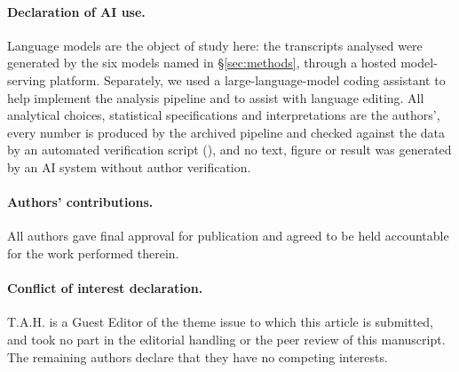 \documentclass[11pt,a4paper]{article}
\begin{document}
\paragraph{Declaration of AI use.} Language models are the object of study here:
the transcripts analysed were generated by the six models named in
\S\ref{sec:methods}, through a hosted model-serving platform. Separately, we
used a large-language-model coding assistant to help implement the analysis
pipeline and to assist with language editing. All analytical choices,
statistical specifications and interpretations are the authors', every number is
produced by the archived pipeline and checked against the data by an automated
verification script (), and no text,
figure or result was generated by an AI system without author verification.

\paragraph{Authors' contributions.} %
All authors gave final approval for publication and agreed to be held
accountable for the work performed therein.

\paragraph{Conflict of interest declaration.} T.A.H. is a Guest Editor of the
theme issue to which this article is submitted, and took no part in the
editorial handling or the peer review of this manuscript. The remaining authors
declare that they have no competing interests.
\end{document}
